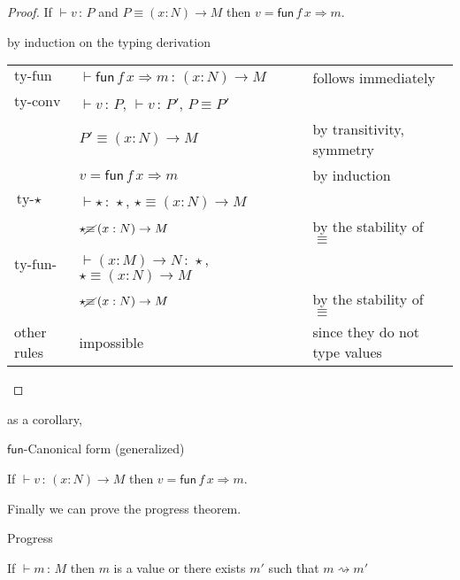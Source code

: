   \begin{proof}
  If $\vdash v\,:\,P$ and $P\equiv\left(x:N\right)\rightarrow M$ then $v=\mathsf{fun}\,f\,x\Rightarrow m$.

by induction on the typing derivation

\begin{tabular}{lll}
$\textrm{ty-fun}$ & $\vdash\mathsf{fun}\,f\,x\Rightarrow m\,:\,\left(x:N\right)\rightarrow M$ & follows immediately\tabularnewline
$\textrm{ty-conv}$ & $\vdash v\,:\,P$, $\vdash v\,:\,P'$, $P\equiv P'$ & \tabularnewline
  & $P'\equiv\left(x:N\right)\rightarrow M$ & by transitivity, symmetry\tabularnewline
  & $v=\mathsf{fun}\,f\,x\Rightarrow m$ & by induction\tabularnewline
$\textrm{ty-}\star$ & $\vdash\star\,:\,\star$, $\star\equiv\left(x:N\right)\rightarrow M$ & \tabularnewline
  & $\star\cancel{\equiv}\left(x:N\right)\rightarrow M$ & by the stability of $\equiv$\tabularnewline
$\textrm{ty-fun-ty}$ & $\vdash\left(x:M\right)\rightarrow N\,:\,\star$, $\star\equiv\left(x:N\right)\rightarrow M$ & \tabularnewline
  & $\star\cancel{\equiv}\left(x:N\right)\rightarrow M$ & by the stability of $\equiv$\tabularnewline
other rules & impossible & since they do not type values\tabularnewline
\end{tabular}
\end{proof}
as a corollary,
\begin{cor}
$\mathsf{fun}$-Canonical form (generalized)

If $\vdash v\,:\,\left(x:N\right)\rightarrow M$ then \textup{$v=\mathsf{fun}\,f\,x\Rightarrow m$.}
\end{cor}


Finally we can prove the progress theorem.
\begin{thm}
Progress 

If $\vdash m\,:\,M$ then $m$ is a value or there exists $m'$ such that $m\rightsquigarrow m'$
\end{thm}

